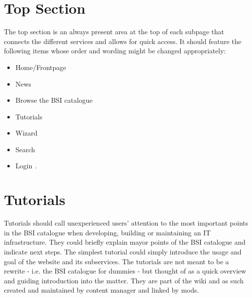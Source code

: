\section{Top Section} 
\label{top_section}

The top section is an always present area at the top of each subpage that connects the different services and allows for quick access.
It should feature the following items whose order and wording might be changed appropriately:
\begin{itemize}
    \item Home/Frontpage
    \item News
    \item Browse the BSI catalogue
    \item Tutorials
    \item Wizard
    \item Search
    \item Login 
        . 
\end{itemize}
\section{Tutorials}
\label{tutorials}

Tutorials should call unexperienced users' attention to the most important points in the BSI catalogue when developing, building or maintaining an IT infrastructure.
They could briefly explain mayor points of the BSI catalogue and indicate next steps.
The simplest tutorial could simply introduce the usage and goal of the website and its subservices.
The tutorials are not meant to be a rewrite - i.e. the BSI catalogue for dummies - but thought of as a quick overview and guiding introduction into the matter.
They are part of the wiki and as such created and maintained by content manager and linked by mods.
